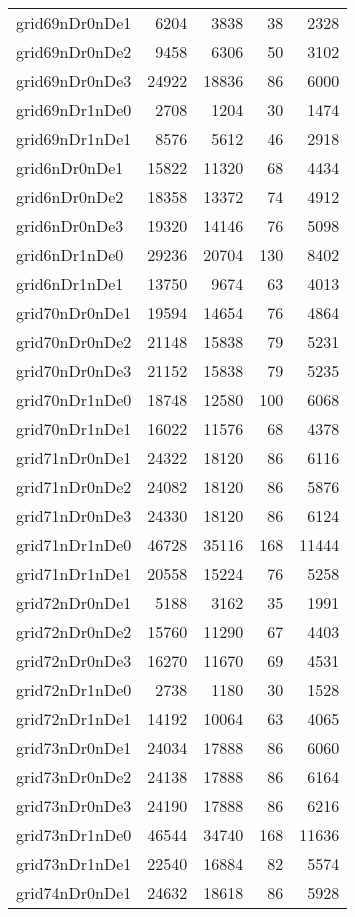 \begin{tabular}{lrrrr}
grid69nDr0nDe1 & 6204 & 3838 & 38 & 2328 \\
grid69nDr0nDe2 & 9458 & 6306 & 50 & 3102 \\
grid69nDr0nDe3 & 24922 & 18836 & 86 & 6000 \\
grid69nDr1nDe0 & 2708 & 1204 & 30 & 1474 \\
grid69nDr1nDe1 & 8576 & 5612 & 46 & 2918 \\
grid6nDr0nDe1 & 15822 & 11320 & 68 & 4434 \\
grid6nDr0nDe2 & 18358 & 13372 & 74 & 4912 \\
grid6nDr0nDe3 & 19320 & 14146 & 76 & 5098 \\
grid6nDr1nDe0 & 29236 & 20704 & 130 & 8402 \\
grid6nDr1nDe1 & 13750 & 9674 & 63 & 4013 \\
grid70nDr0nDe1 & 19594 & 14654 & 76 & 4864 \\
grid70nDr0nDe2 & 21148 & 15838 & 79 & 5231 \\
grid70nDr0nDe3 & 21152 & 15838 & 79 & 5235 \\
grid70nDr1nDe0 & 18748 & 12580 & 100 & 6068 \\
grid70nDr1nDe1 & 16022 & 11576 & 68 & 4378 \\
grid71nDr0nDe1 & 24322 & 18120 & 86 & 6116 \\
grid71nDr0nDe2 & 24082 & 18120 & 86 & 5876 \\
grid71nDr0nDe3 & 24330 & 18120 & 86 & 6124 \\
grid71nDr1nDe0 & 46728 & 35116 & 168 & 11444 \\
grid71nDr1nDe1 & 20558 & 15224 & 76 & 5258 \\
grid72nDr0nDe1 & 5188 & 3162 & 35 & 1991 \\
grid72nDr0nDe2 & 15760 & 11290 & 67 & 4403 \\
grid72nDr0nDe3 & 16270 & 11670 & 69 & 4531 \\
grid72nDr1nDe0 & 2738 & 1180 & 30 & 1528 \\
grid72nDr1nDe1 & 14192 & 10064 & 63 & 4065 \\
grid73nDr0nDe1 & 24034 & 17888 & 86 & 6060 \\
grid73nDr0nDe2 & 24138 & 17888 & 86 & 6164 \\
grid73nDr0nDe3 & 24190 & 17888 & 86 & 6216 \\
grid73nDr1nDe0 & 46544 & 34740 & 168 & 11636 \\
grid73nDr1nDe1 & 22540 & 16884 & 82 & 5574 \\
grid74nDr0nDe1 & 24632 & 18618 & 86 & 5928 \\

\end{tabular}
